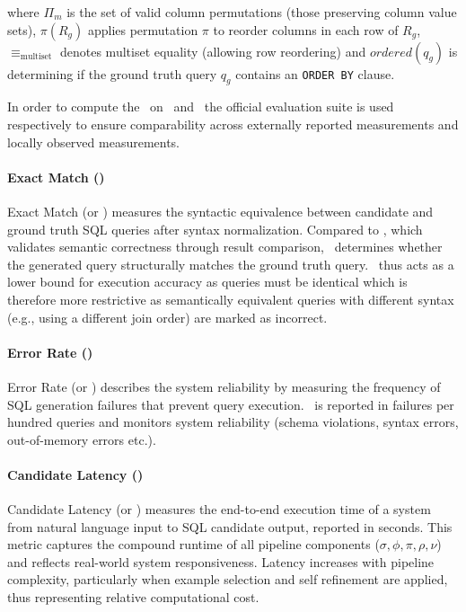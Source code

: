 where $\Pi_m$ is the set of valid column permutations (those preserving column
value sets), $\pi(R_g)$ applies permutation $\pi$ to reorder columns in each
row of $R_g$, $\equiv_{\text{multiset}}$ denotes multiset equality (allowing
row reordering) and $ordered(q_g)$ is determining if the ground truth query
$q_g$ contains an \texttt{ORDER BY} clause.

In order to compute the \EA~on \Spider~and \Bird~the official evaluation suite
is used respectively to ensure comparability across externally reported
measurements and locally observed measurements.

\paragraph{Exact Match (\EM)}

Exact Match (or \EM) measures the syntactic equivalence between
candidate and ground truth SQL queries after syntax normalization. Compared to
\EA, which validates semantic correctness through result comparison,
\EM~determines whether the generated query structurally matches the ground
truth query. \EM~thus acts as a lower bound for execution accuracy as queries
must be identical which is therefore more restrictive as semantically
equivalent queries with different syntax (e.g., using a different join order)
are marked as incorrect.

\paragraph{Error Rate (\ER)}

Error Rate (or \ER) describes the system reliability by measuring the
frequency of SQL generation failures that prevent query execution. \ER~is
reported in failures per hundred queries and monitors system reliability
(schema violations, syntax errors, out-of-memory errors etc.).

\paragraph{Candidate Latency (\CL)}

Candidate Latency (or \CL) measures the end-to-end execution
time of a system from natural language input to SQL candidate output, reported
in seconds. This metric captures the compound runtime of all pipeline
components ($\sigma, \phi, \pi, \rho, \nu$) and reflects real-world system
responsiveness. Latency increases with pipeline complexity, particularly when
example selection and self refinement are applied, thus representing relative
computational cost.

